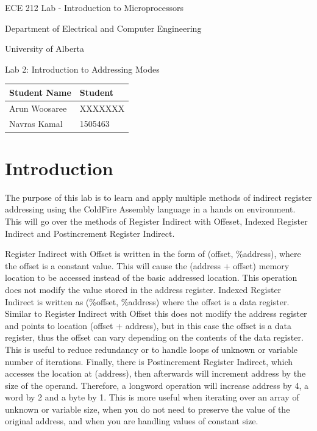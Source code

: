 \documentclass[letterpaper]{article}
\begin{document}
  \begin{titlepage}
    \begin{center}

      \LARGE
      ECE 212 Lab - Introduction to Microprocessors

      Department of Electrical and Computer Engineering

      University of Alberta

      \vspace{2cm}

      Lab 2: Introduction to Addressing Modes

      \vspace{5cm}
      \Large

      \begin{tabular}{ | m{5cm} | m{5cm} | }
        \hline
        Student Name & Student \\
        \hline
        Arun Woosaree & XXXXXXX \\
        \hline
        Navras Kamal & 1505463 \\
        \hline
      \end{tabular}

    \end{center}
\end{titlepage}


\tableofcontents

\newpage

\section{Introduction}
  The purpose of this lab is to learn and apply multiple methods of indirect
  register addressing using the ColdFire Assembly language in a hands on
  environment. This will go over the methods of Register Indirect with Offeset,
  Indexed Register Indirect and Postincrement Register Indirect.

  Register Indirect with Offset is written in the form of (offset, \%address), where
  the offset is a constant value. This will cause the (address + offset) memory
  location to be accessed instead of the basic addressed location. This operation does
  not modify the value stored in the address register. Indexed Register Indirect is
  written as (\%offset, \%address) where the offset is a data register. Similar to
  Register Indirect with Offset this does not modify the address register and points
  to location (offset + address), but in this case the offset is a data register, thus
  the offset can vary depending on the contents of the data register. This is useful
  to reduce redundancy or to handle loops of unknown or variable number of iterations.
  Finally, there is Postincrement Register Indirect, which accesses the location at
  (address), then afterwards will increment address by the size of the operand.
  Therefore, a longword operation will increase address by 4, a word by 2 and a byte by 1.
  This is more useful when iterating over an array of unknown or variable size, when you
  do not need to preserve the value of the original address, and when you are handling
  values of constant size.
\end{document}
